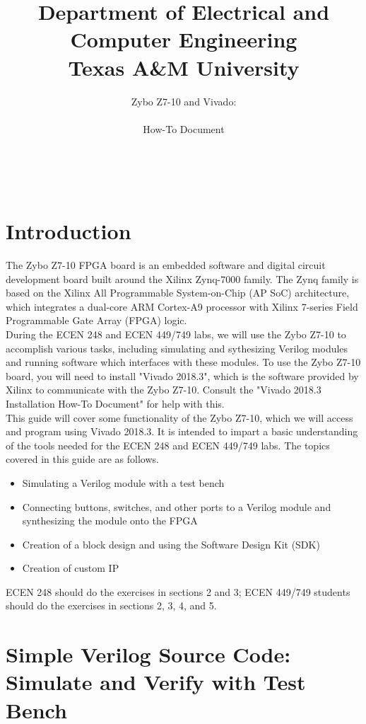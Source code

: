 \documentclass[11pt,twoside,titlepage]{article}
\title{ \huge Department of Electrical and Computer Engineering\\ \huge Texas A\&M University \\}
\author{ \huge Zybo Z7-10 and Vivado:\\ \\ \huge How-To Document \\ \\ \\ \\ \ta}
\date{}
\begin{document}

\maketitle


\section{Introduction}

The Zybo Z7-10 FPGA board is an embedded software and digital circuit development board built around the Xilinx Zynq-7000 family. The Zynq family is based on the Xilinx All Programmable System-on-Chip (AP SoC) architecture, which integrates a dual-core ARM Cortex-A9 processor with Xilinx 7-series Field Programmable Gate Array (FPGA) logic. \\

\noindent
During the ECEN 248 and ECEN 449/749 labs, we will use the Zybo Z7-10 to accomplish various tasks, including simulating and sythesizing Verilog modules and running software which interfaces with these modules. To use the Zybo Z7-10 board, you will need to install "Vivado 2018.3", which is the software provided by Xilinx to communicate with the Zybo Z7-10. Consult the "Vivado 2018.3 Installation How-To Document" for help with this.\\

\noindent
This guide will cover some functionality of the Zybo Z7-10, which we will access and program using Vivado 2018.3. It is intended to impart a basic understanding of the tools needed for the ECEN 248 and ECEN 449/749 labs. The topics covered in this guide are as follows.

\begin{itemize}
\item Simulating a Verilog module with a test bench
\item Connecting buttons, switches, and other ports to a Verilog module and synthesizing the module onto the FPGA
\item Creation of a block design and using the Software Design Kit (SDK)
\item Creation of custom IP
\end{itemize}

\noindent
ECEN 248 should do the exercises in sections 2 and 3; ECEN 449/749 students should do the exercises in sections 2, 3, 4, and 5.\\

\section{Simple Verilog Source Code: Simulate and Verify with Test Bench} 
\end{document}
